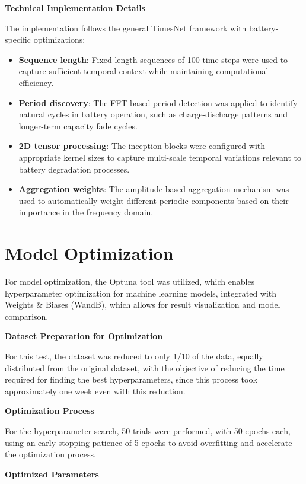 \textbf{Technical Implementation Details}

The implementation follows the general TimesNet framework with battery-specific optimizations:

\begin{itemize}
    \item \textbf{Sequence length}: Fixed-length sequences of 100 time steps were used to capture sufficient temporal context while maintaining computational efficiency.
    \item \textbf{Period discovery}: The FFT-based period detection was applied to identify natural cycles in battery operation, such as charge-discharge patterns and longer-term capacity fade cycles.
    \item \textbf{2D tensor processing}: The inception blocks were configured with appropriate kernel sizes to capture multi-scale temporal variations relevant to battery degradation processes.
    \item \textbf{Aggregation weights}: The amplitude-based aggregation mechanism was used to automatically weight different periodic components based on their importance in the frequency domain.
\end{itemize}

\section{Model Optimization}
\label{sec:model_optimization}

For model optimization, the Optuna tool was utilized, which enables hyperparameter optimization for machine learning models, integrated with Weights \& Biases (WandB), which allows for result visualization and model comparison.

\textbf{Dataset Preparation for Optimization}

For this test, the dataset was reduced to only 1/10 of the data, equally distributed from the original dataset, with the objective of reducing the time required for finding the best hyperparameters, since this process took approximately one week even with this reduction.

\textbf{Optimization Process}
\label{subsec:optimization_process}

For the hyperparameter search, 50 trials were performed, with 50 epochs each, using an early stopping patience of 5 epochs to avoid overfitting and accelerate the optimization process.

\textbf{Optimized Parameters}

